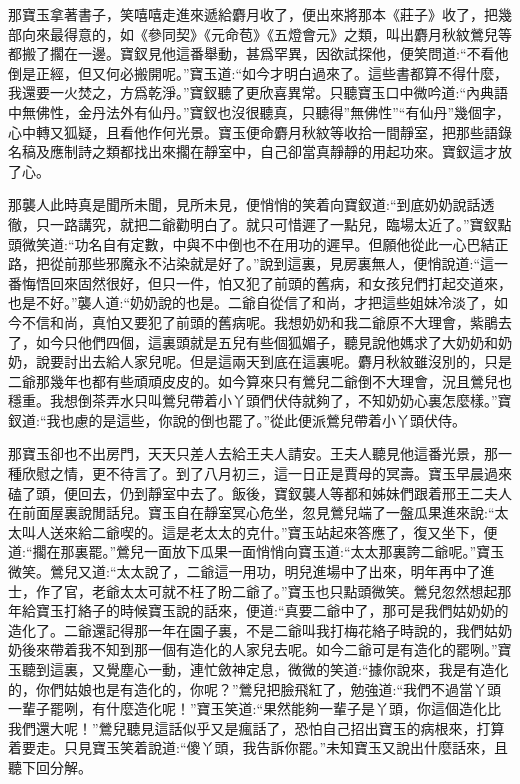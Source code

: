 \begin{parag}
    那寶玉拿著書子，笑嘻嘻走進來遞給麝月收了，便出來將那本《莊子》收了，把幾部向來最得意的，如《參同契》《元命苞》《五燈會元》之類，叫出麝月秋紋鶯兒等都搬了擱在一邊。寶釵見他這番舉動，甚爲罕異，因欲試探他，便笑問道:“不看他倒是正經，但又何必搬開呢。”寶玉道:“如今才明白過來了。這些書都算不得什麼，我還要一火焚之，方爲乾淨。”寶釵聽了更欣喜異常。只聽寶玉口中微吟道:“內典語中無佛性，金丹法外有仙丹。”寶釵也沒很聽真，只聽得”無佛性”“有仙丹”幾個字，心中轉又狐疑，且看他作何光景。寶玉便命麝月秋紋等收拾一間靜室，把那些語錄名稿及應制詩之類都找出來擱在靜室中，自己卻當真靜靜的用起功來。寶釵這才放了心。
\end{parag}


\begin{parag}
    那襲人此時真是聞所未聞，見所未見，便悄悄的笑着向寶釵道:“到底奶奶說話透徹，只一路講究，就把二爺勸明白了。就只可惜遲了一點兒，臨場太近了。”寶釵點頭微笑道:“功名自有定數，中與不中倒也不在用功的遲早。但願他從此一心巴結正路，把從前那些邪魔永不沾染就是好了。”說到這裏，見房裏無人，便悄說道:“這一番悔悟回來固然很好，但只一件，怕又犯了前頭的舊病，和女孩兒們打起交道來，也是不好。”襲人道:“奶奶說的也是。二爺自從信了和尚，才把這些姐妹冷淡了，如今不信和尚，真怕又要犯了前頭的舊病呢。我想奶奶和我二爺原不大理會，紫鵑去了，如今只他們四個，這裏頭就是五兒有些個狐媚子，聽見說他媽求了大奶奶和奶奶，說要討出去給人家兒呢。但是這兩天到底在這裏呢。麝月秋紋雖沒別的，只是二爺那幾年也都有些頑頑皮皮的。如今算來只有鶯兒二爺倒不大理會，況且鶯兒也穩重。我想倒茶弄水只叫鶯兒帶着小丫頭們伏侍就夠了，不知奶奶心裏怎麼樣。”寶釵道:“我也慮的是這些，你說的倒也罷了。”從此便派鶯兒帶着小丫頭伏侍。
\end{parag}


\begin{parag}
    那寶玉卻也不出房門，天天只差人去給王夫人請安。王夫人聽見他這番光景，那一種欣慰之情，更不待言了。到了八月初三，這一日正是賈母的冥壽。寶玉早晨過來磕了頭，便回去，仍到靜室中去了。飯後，寶釵襲人等都和姊妹們跟着邢王二夫人在前面屋裏說閒話兒。寶玉自在靜室冥心危坐，忽見鶯兒端了一盤瓜果進來說:“太太叫人送來給二爺喫的。這是老太太的克什。”寶玉站起來答應了，復又坐下，便道:“擱在那裏罷。”鶯兒一面放下瓜果一面悄悄向寶玉道:“太太那裏誇二爺呢。”寶玉微笑。鶯兒又道:“太太說了，二爺這一用功，明兒進場中了出來，明年再中了進士，作了官，老爺太太可就不枉了盼二爺了。”寶玉也只點頭微笑。鶯兒忽然想起那年給寶玉打絡子的時候寶玉說的話來，便道:“真要二爺中了，那可是我們姑奶奶的造化了。二爺還記得那一年在園子裏，不是二爺叫我打梅花絡子時說的，我們姑奶奶後來帶着我不知到那一個有造化的人家兒去呢。如今二爺可是有造化的罷咧。”寶玉聽到這裏，又覺塵心一動，連忙斂神定息，微微的笑道:“據你說來，我是有造化的，你們姑娘也是有造化的，你呢？”鶯兒把臉飛紅了，勉強道:“我們不過當丫頭一輩子罷咧，有什麼造化呢！”寶玉笑道:“果然能夠一輩子是丫頭，你這個造化比我們還大呢！”鶯兒聽見這話似乎又是瘋話了，恐怕自己招出寶玉的病根來，打算着要走。只見寶玉笑着說道:“傻丫頭，我告訴你罷。”未知寶玉又說出什麼話來，且聽下回分解。
\end{parag}